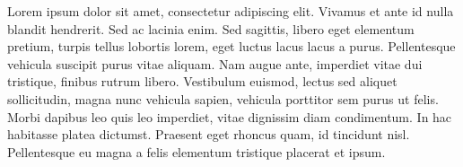Lorem ipsum dolor sit amet, consectetur adipiscing elit. Vivamus et ante id nulla blandit hendrerit. Sed ac lacinia enim. Sed sagittis, libero eget elementum pretium, turpis tellus lobortis lorem, eget luctus lacus lacus a purus. Pellentesque vehicula suscipit purus vitae aliquam. Nam augue ante, imperdiet vitae dui tristique, finibus rutrum libero. Vestibulum euismod, lectus sed aliquet sollicitudin, magna nunc vehicula sapien, vehicula porttitor sem purus ut felis. Morbi dapibus leo quis leo imperdiet, vitae dignissim diam condimentum. In hac habitasse platea dictumst. Praesent eget rhoncus quam, id tincidunt nisl. Pellentesque eu magna a felis elementum tristique placerat et ipsum.
